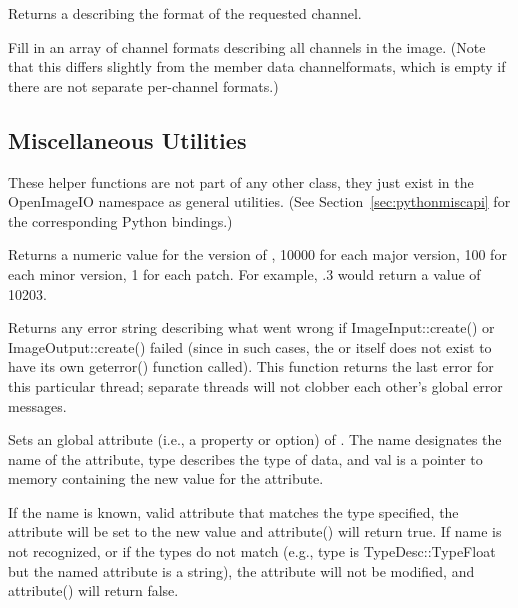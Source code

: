 Returns a \TypeDesc describing the format of the requested channel.
\apiend

Fill in an array of channel formats describing all channels in the
image.  (Note that this differs slightly from the member data 
{\cf channelformats}, which is empty if there are not separate per-channel
formats.)
\apiend


\subsection{Miscellaneous Utilities}
\label{sec:miscapi}

These helper functions are not part of any other \OpenImageIO class,
they just exist in the {\cf OpenImageIO} namespace as general utilities.
(See Section~\ref{sec:pythonmiscapi} for the corresponding Python
bindings.)

Returns a numeric value for the version of \product, 10000 for each
major version, 100 for each minor version, 1 for each patch.  For
example, .3 would return a value of 10203.
\apiend

Returns any error string describing what went wrong if 
{\cf ImageInput::create()} or {\cf ImageOutput::create()} failed
(since in such cases, the \ImageInput or \ImageOutput itself does 
not exist to have its own {\cf geterror()} function called).
This function returns the last error
for this particular thread; separate threads will not clobber each
other's global error messages.
\apiend



Sets an global attribute (i.e., a property or option) of \product.
The {\cf name} designates the name of the attribute, {\cf type}
describes the type of data, and {\cf val} is a pointer to memory 
containing the new value for the attribute.

If the name is known, valid attribute that matches the type specified,
the attribute will be set to the new value and {\cf attribute()} will
return {\cf true}.  If {\cf name} is not recognized, or if the types do
not match (e.g., {\cf type} is {\cf TypeDesc::TypeFloat} but the named
attribute is a string), the attribute will not be modified, and {\cf
  attribute()} will return {\cf false}.

